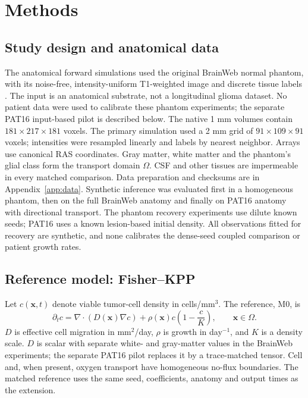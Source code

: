 \section{Methods}
\subsection{Study design and anatomical data}
The anatomical forward simulations used the original BrainWeb normal phantom, with its noise-free, intensity-uniform T1-weighted image and discrete tissue labels \citep{collins1998,brainweb}. The input is an anatomical substrate, not a longitudinal glioma dataset. No patient data were used to calibrate these phantom experiments; the separate PAT16 input-based pilot is described below. The native 1 mm volumes contain $181\times217\times181$ voxels. The primary simulation used a 2 mm grid of $91\times109\times91$ voxels; intensities were resampled linearly and labels by nearest neighbor. Arrays use canonical RAS coordinates. Gray matter, white matter and the phantom's glial class form the transport domain $\Omega$. CSF and other tissues are impermeable in every matched comparison. Data preparation and checksums are in Appendix~\ref{app:data}. Synthetic inference was evaluated first in a homogeneous phantom, then on the full BrainWeb anatomy and finally on PAT16 anatomy with directional transport. The phantom recovery experiments use dilute known seeds; PAT16 uses a known lesion-based initial density. All observations fitted for recovery are synthetic, and none calibrates the dense-seed coupled comparison or patient growth rates.

\subsection{Reference model: Fisher--KPP}
Let $c(\bm{x},t)$ denote viable tumor-cell density in cells/mm$^3$. The reference, M0, is
\begin{equation}
 \partial_t c=\nabla\!\cdot\!\left(D(\bm{x})\nabla c\right)+\rho(\bm{x})c\left(1-\frac{c}{K}\right),\qquad\bm{x}\in\Omega .\label{eq:kpp}
\end{equation}
$D$ is effective cell migration in mm$^2$/day, $\rho$ is growth in day$^{-1}$, and $K$ is a density scale. $D$ is scalar with separate white- and gray-matter values in the BrainWeb experiments; the separate PAT16 pilot replaces it by a trace-matched tensor. Cell and, when present, oxygen transport have homogeneous no-flux boundaries. The matched reference uses the same seed, coefficients, anatomy and output times as the extension.

